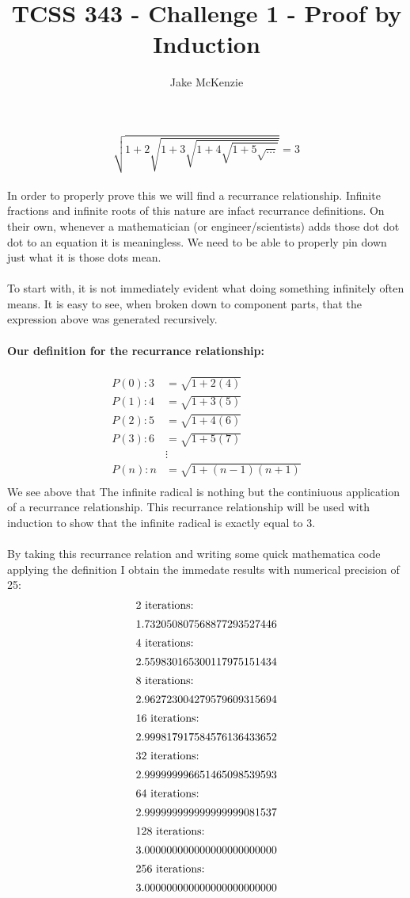 \documentclass[12pt]{article}
\begin{document}
\title{TCSS 343 - Challenge 1 - Proof by Induction}
\author{Jake McKenzie}
\maketitle
\[\sqrt{1+2\sqrt{1+3\sqrt{1+4\sqrt{1+5\sqrt{\dots}}}}} = 3\]\\
In order to properly prove this we will find a recurrance relationship. Infinite fractions and infinite roots of this nature are infact recurrance definitions. On their own, whenever a mathematician (or engineer/scientists) adds those dot dot dot to an equation it is meaningless. We need to be able to properly pin down just what it is those dots mean. \\\\
To start with, it is not immediately evident what doing something infinitely often means. It is easy to see, when broken down to component parts, that the expression above was generated recursively. \\\\
\textbf{Our definition for the recurrance relationship:}\\\\
\begin{align*}
P(0):3 &= \sqrt{1+2(4)}\\
P(1):4 &= \sqrt{1+3(5)}\\
P(2):5 &= \sqrt{1+4(6)}\\
P(3):6 &= \sqrt{1+5(7)}\\
&\vdots\\
P(n):n &= \sqrt{1+(n-1)(n+1)}\\
\end{align*}
We see above that The infinite radical is nothing but the continiuous application of a recurrance relationship. This recurrance relationship will be used with induction to show that the infinite radical is exactly equal to 3.\\\\
By taking this recurrance relation and writing some quick mathematica code applying the definition I obtain the immedate results with numerical precision of 25:
\begin{align*}
\intertext{2 iterations:} & 1.732050807568877293527446\\
\intertext{4 iterations:} & 2.559830165300117975151434\\
\intertext{8 iterations:} & 2.962723004279579609315694\\
\intertext{16 iterations:} & 2.999817917584576136433652\\
\intertext{32 iterations:} & 2.999999996651465098539593\\
\intertext{64 iterations:} & 2.999999999999999999081537\\
\intertext{128 iterations:} & 3.000000000000000000000000\\
\intertext{256 iterations:} & 3.000000000000000000000000\\
\end{align*}
\end{document}
